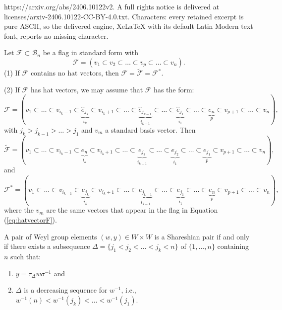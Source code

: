 \documentclass[10pt,a4paper]{amsart}
\newcommand{\B}{\mathcal{B}}
\newcommand{\F}{\mathcal{F}}
\newcommand{\he}{\hat{e}}
\begin{document}
https://arxiv.org/abs/2406.10122v2. A full rights notice is delivered at licenses/arxiv-2406.10122-CC-BY-4.0.txt. Characters: every retained excerpt is pure ASCII, so the delivered engine, XeLaTeX with its default Latin Modern text font, reports no missing character.
\begin{prop}\label{p:orbits}
Let $\F\subset \B_{n}$ be a flag in standard form with 
$$
\F=(v_{1}\subset v_{2}\subset \dots\subset v_{p}\subset \dots\subset v_{n}).
$$  
(1) If $\F$ contains no hat vectors, then 
$\F=\tilde{\F}=\F^{*}$. 

\noindent (2) If $\F$ has hat vectors, we may assume that $\F$ has the form:
\begin{equation}\label{eq:hatvectorF}
\F=(v_{1}\subset\dots\subset v_{i_{k}-1}\subset\underbrace{ \he_{j_{k}}}_{i_{k}}\subset v_{i_{k}+1}\subset \dots \subset \underbrace{\he_{j_{k-1}}}_{i_{k-1}}\subset \dots \subset \underbrace{\he_{j_{1}}}_{i_{1}}\subset \dots\subset \underbrace{e_{n}}_{p}\subset v_{p+1}\subset \dots\subset v_{n}),
\end{equation}
with $j_{k}>j_{k-1}>\dots>j_{1}$ and $v_{m}$ a standard basis vector.  
Then
\begin{equation}\label{eq:tildeF}
\tilde{\F}=(v_{1}\subset\dots\subset v_{i_{k}-1}\subset\underbrace{e_{n}}_{i_{k}}\subset v_{i_{k}+1}\subset \dots\subset \underbrace{e_{j_{k}}}_{i_{k-1}}\subset\dots\subset \underbrace{e_{j_{2}}}_{i_{1}}\subset \dots\subset\underbrace{e_{j_{1}}}_{p}\subset v_{p+1}\subset\dots\subset v_{n}),
\end{equation}
and 
\begin{equation}\label{eq:starF}
\F^{*}=(v_{1}\subset \dots\subset v_{i_{k-1}}\subset \underbrace{e_{j_{k}}}_{i_{k}}\subset v_{i_{k}+1}\subset \dots\subset \underbrace{e_{j_{k-1}}}_{i_{k-1}}\subset \dots\subset \underbrace{e_{j_{1}}}_{i_{1}}\subset \dots\subset\underbrace{e_{n}}_{p}\subset v_{p+1}\subset \dots\subset v_{n}),
\end{equation}
where the $v_{m}$ are the same vectors that appear in the flag in Equation (\ref{eq:hatvectorF}).

\end{prop}

\begin{prop}\label{p:Shpairs}
 A pair of Weyl group elements 
$(w, y)\in W\times W$ is a Shareshian pair if and only if there exists a subsequence $\Delta = \{j_{1}<j_{2}<\dots<j_{k}<n\}$ of $\{1,\dots, n\}$ containing $n$ such that: 
\begin{enumerate}
\item $y=\tau_{\Delta}w\sigma^{-1}$ and
\item $\Delta$ is a decreasing sequence for $w^{-1}$, i.e., $w^{-1}(n)<w^{-1}(j_{k})<\dots <w^{-1}(j_{1}).$
\end{enumerate}
\end{prop}
\end{document}
